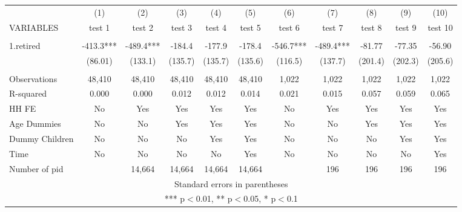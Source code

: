 \begin{tabular}{lcccccccccc} \hline
 & (1) & (2) & (3) & (4) & (5) & (6) & (7) & (8) & (9) & (10) \\
VARIABLES & test 1 & test 2 & test 3 & test 4 & test 5 & test 6 & test 7 & test 8 & test 9 & test 10 \\ \hline
 &  &  &  &  &  &  &  &  &  &  \\
1.retired & -413.3*** & -489.4*** & -184.4 & -177.9 & -178.4 & -546.7*** & -489.4*** & -81.77 & -77.35 & -56.90 \\
 & (86.01) & (133.1) & (135.7) & (135.7) & (135.6) & (116.5) & (137.7) & (201.4) & (202.3) & (205.6) \\
 &  &  &  &  &  &  &  &  &  &  \\
Observations & 48,410 & 48,410 & 48,410 & 48,410 & 48,410 & 1,022 & 1,022 & 1,022 & 1,022 & 1,022 \\
R-squared & 0.000 & 0.000 & 0.012 & 0.012 & 0.014 & 0.021 & 0.015 & 0.057 & 0.059 & 0.065 \\
HH FE & No & Yes & Yes & Yes & Yes & No & Yes & Yes & Yes & Yes \\
Age Dummies & No & No & Yes & Yes & Yes & No & No & Yes & Yes & Yes \\
Dummy Children & No & No & No & Yes & Yes & No & No & No & Yes & Yes \\
Time & No & No & No & No & Yes & No & No & No & No & Yes \\
 Number of pid &  & 14,664 & 14,664 & 14,664 & 14,664 &  & 196 & 196 & 196 & 196 \\ \hline
\multicolumn{11}{c}{ Standard errors in parentheses} \\
\multicolumn{11}{c}{ *** p$<$0.01, ** p$<$0.05, * p$<$0.1} \\
\end{tabular}
